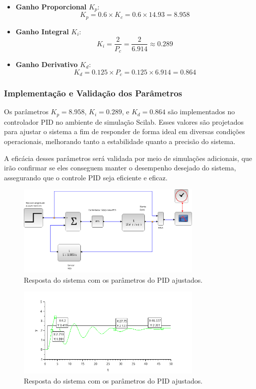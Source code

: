 \begin{itemize}
    \item \textbf{Ganho Proporcional} \( K_p \):
          \[
              K_p = 0.6 \times K_c = 0.6 \times 14.93 = 8.958
          \]
    \item \textbf{Ganho Integral} \( K_i \):
          \[
              K_i = \frac{2}{P_c} = \frac{2}{6.914} \approx 0.289
          \]
    \item \textbf{Ganho Derivativo} \( K_d \):
          \[
              K_d = 0.125 \times P_c = 0.125 \times 6.914 = 0.864
          \]
\end{itemize}

\subsubsection{Implementação e Validação dos Parâmetros}
Os parâmetros \( K_p = 8.958 \), \( K_i = 0.289 \), e \( K_d = 0.864 \) são implementados no controlador PID no ambiente de simulação Scilab. Esses valores são projetados para ajustar o sistema a fim de responder de forma ideal em diversas condições operacionais, melhorando tanto a estabilidade quanto a precisão do sistema.

A eficácia desses parâmetros será validada por meio de simulações adicionais, que irão confirmar se eles conseguem manter o desempenho desejado do sistema, assegurando que o controle PID seja eficiente e eficaz.

\begin{figure}[H]
    \centering
    \includegraphics[width=0.8\textwidth]{atividades/6-atividade/assets/a/diagrama-pid.png}
    \caption{Resposta do sistema com os parâmetros do PID ajustados.}
    \label{fig:diagrama-pid}
\end{figure}

\begin{figure}[H]
    \centering
    \includegraphics[width=0.8\textwidth]{atividades/6-atividade/assets/a/pid.png}
    \caption{Resposta do sistema com os parâmetros do PID ajustados.}
    \label{fig:resposta-pid}
\end{figure}

